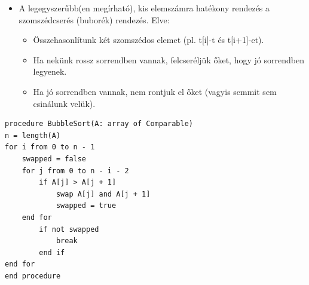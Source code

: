 \documentclass[11pt,a4paper]{article}
\begin{document}
            \begin{tcolorbox}[colback=blue!5!white,colframe=blue!50!black,title= 56. Ismertesse a szomszédcserés rendezés működését és komplexitását!]
                \begin{itemize}
                    \item A legegyszerűbb(en megírható), kis elemszámra hatékony rendezés a szomszédcserés (buborék) rendezés. Elve:
                    \begin{itemize}
                        
                        \item Összehasonlítunk két szomszédos elemet (pl. t[i]-t és t[i+1]-et).
                        \item Ha nekünk rossz sorrendben vannak, felcseréljük őket, hogy jó sorrendben legyenek.
                        \item Ha jó sorrendben vannak, nem rontjuk el őket (vagyis semmit sem csinálunk velük).
                    \end{itemize}
                \end{itemize}
                \begin{Verbatim}
procedure BubbleSort(A: array of Comparable)
n = length(A)
for i from 0 to n - 1
    swapped = false
    for j from 0 to n - i - 2
        if A[j] > A[j + 1]
            swap A[j] and A[j + 1]
            swapped = true
    end for
        if not swapped
            break
        end if
end for
end procedure                    
                \end{Verbatim}
            \end{tcolorbox}
\end{document}
